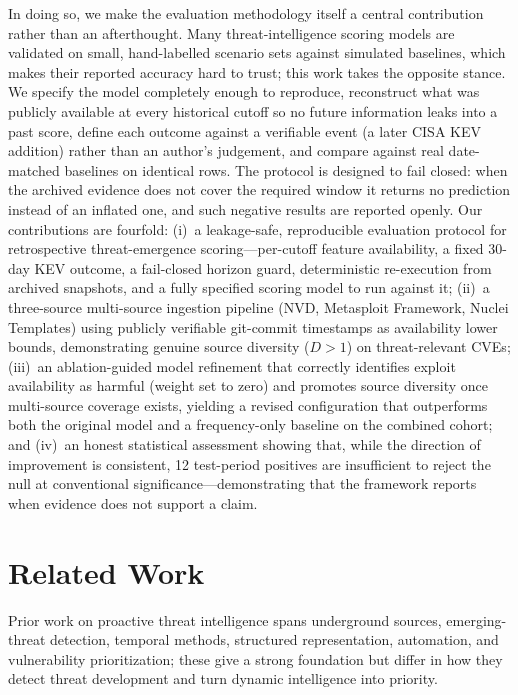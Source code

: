 \documentclass[conference]{IEEEtran}
\begin{document}
In doing so, we make the evaluation methodology itself a central contribution rather than an afterthought. Many threat-intelligence scoring models are validated on small, hand-labelled scenario sets against simulated baselines, which makes their reported accuracy hard to trust; this work takes the opposite stance. We specify the model completely enough to reproduce, reconstruct what was publicly available at every historical cutoff so no future information leaks into a past score, define each outcome against a verifiable event (a later CISA KEV addition) rather than an author's judgement, and compare against real date-matched baselines on identical rows. The protocol is designed to fail closed: when the archived evidence does not cover the required window it returns no prediction instead of an inflated one, and such negative results are reported openly. Our contributions are fourfold: (i)~a leakage-safe, reproducible evaluation protocol for retrospective threat-emergence scoring---per-cutoff feature availability, a fixed 30-day KEV outcome, a fail-closed horizon guard, deterministic re-execution from archived snapshots, and a fully specified scoring model to run against it; (ii)~a three-source multi-source ingestion pipeline (NVD, Metasploit Framework, Nuclei Templates) using publicly verifiable git-commit timestamps as availability lower bounds, demonstrating genuine source diversity ($D>1$) on threat-relevant CVEs; (iii)~an ablation-guided model refinement that correctly identifies exploit availability as harmful (weight set to zero) and promotes source diversity once multi-source coverage exists, yielding a revised configuration that outperforms both the original model and a frequency-only baseline on the combined cohort; and (iv)~an honest statistical assessment showing that, while the direction of improvement is consistent, 12 test-period positives are insufficient to reject the null at conventional significance---demonstrating that the framework reports when evidence does not support a claim.

\section{Related Work}

Prior work on proactive threat intelligence spans underground sources, emerging-threat detection, temporal methods, structured representation, automation, and vulnerability prioritization; these give a strong foundation but differ in how they detect threat development and turn dynamic intelligence into priority.
\end{document}
